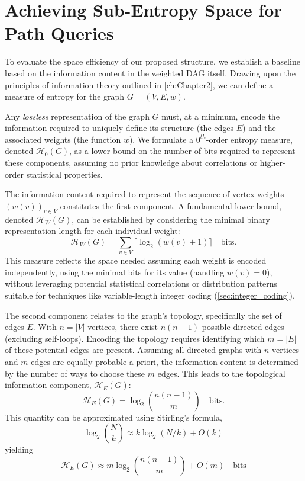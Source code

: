 \section{Achieving Sub-Entropy Space for Path Queries}
\label{sec:below_entropy}

To evaluate the space efficiency of our proposed structure, we establish a baseline based on the information content in the weighted DAG itself. Drawing upon the principles of information theory outlined in \autoref{ch:Chapter2}, we can define a measure of entropy for the graph $G=(V, E, w)$.

Any \emph{lossless} representation of the graph $G$ must, at a minimum, encode the information required to uniquely define its structure (the edges $E$) and the associated weights (the function $w$). We formulate a $0^{th}$-order entropy measure, denoted $\mathcal{H}_0(G)$, as a lower bound on the number of bits required to represent these components, assuming no prior knowledge about correlations or higher-order statistical properties.

The information content required to represent the sequence of vertex weights $(w(v))_{v \in V}$ constitutes the first component. A fundamental lower bound, denoted $\mathcal{H}_W(G)$, can be established by considering the minimal binary representation length for each individual weight:
\[ \mathcal{H}_W(G) = \sum_{v \in V} \lceil \log_2 (w(v)+1) \rceil \quad \text{bits}. \]
This measure reflects the space needed assuming each weight is encoded independently, using the minimal bits for its value (handling $w(v)=0$), without leveraging potential statistical correlations or distribution patterns suitable for techniques like variable-length integer coding (\autoref{sec:integer_coding}).

The second component relates to the graph's topology, specifically the set of edges $E$. With $n = |V|$ vertices, there exist $n(n-1)$ possible directed edges (excluding self-loops). Encoding the topology requires identifying which $m = |E|$ of these potential edges are present. Assuming all directed graphs with $n$ vertices and $m$ edges are equally probable a priori, the information content is determined by the number of ways to choose these $m$ edges. This leads to the topological information component, $\mathcal{H}_E(G)$:
\[ \mathcal{H}_E(G) = \log_2 \binom{n(n-1)}{m} \quad \text{bits}. \]
This quantity can be approximated using Stirling's formula,
\[\log_2 \binom{N}{k} \approx k \log_2(N/k) + O(k)\]
yielding
\[\mathcal{H}_E(G) \approx m \log_2 \left( \frac{n(n-1)}{m} \right) + O(m) \quad \text{bits}\]


